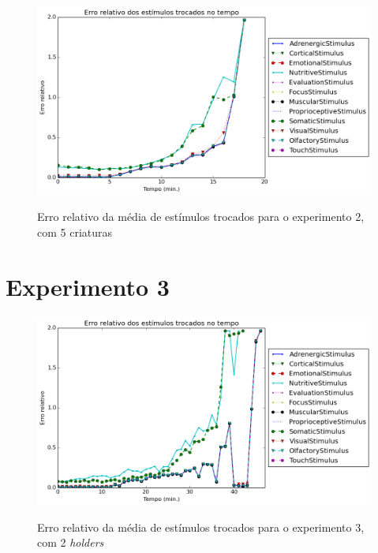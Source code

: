 \begin{apendicesenv}
\begin{figure}[H]
 \centering
 \caption{Erro relativo da média de estímulos trocados para o experimento 2, com 5 criaturas}
 \includegraphics[scale=0.6]{04-figuras/experiments/exp_2/5/avgExchangedStimuliOverTime_err.png}
 \label{fig:exp_2_5_avgExchStimuli_err}
\end{figure}

\section{Experimento 3}
\label{ap:erroExp3}

\begin{figure}[H]
 \centering
 \caption{Erro relativo da média de estímulos trocados para o experimento 3, com 2 \textit{holders}}
 \includegraphics[scale=0.6]{04-figuras/experiments/exp_3/2/avgExchangedStimuliOverTime_err.png}
 \label{fig:exp_3_2_avgExchStimuli_err}
\end{figure}


\end{apendicesenv}

